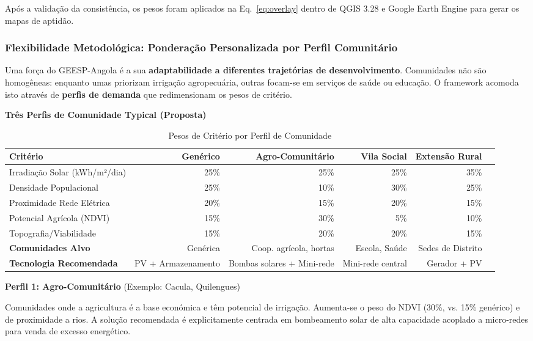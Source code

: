 \documentclass[12pt, a4paper]{article}
\begin{document}
Após a validação da consistência, os pesos foram aplicados na Eq.~\ref{eq:overlay} dentro de QGIS 3.28 e Google Earth Engine para gerar os mapas de aptidão.

\subsubsection{Flexibilidade Metodológica: Ponderação Personalizada por Perfil Comunitário}

Uma força do GEESP-Angola é a sua \textbf{adaptabilidade a diferentes trajetórias de 
desenvolvimento}. Comunidades não são homogêneas: enquanto umas priorizam irrigação 
agropecuária, outras focam-se em serviços de saúde ou educação. O framework acomoda 
isto através de \textbf{perfis de demanda} que redimensionam os pesos de critério.

\textbf{Três Perfis de Comunidade Typical (Proposta)}

\begin{table}[H]
\centering
\caption{Pesos de Critério por Perfil de Comunidade}
\label{tab:profiles_weights}
\footnotesize
\begin{tabular}{|l|r|r|r|r|r|}
\hline
\textbf{Critério} & \textbf{Genérico} & \textbf{Agro-Comunitário} & \textbf{Vila Social} & \textbf{Extensão Rural} \\
\hline
Irradiação Solar (kWh/m²/dia) & 25\% & 25\% & 25\% & 35\% \\
Densidade Populacional & 25\% & 10\% & 30\% & 25\% \\
Proximidade Rede Elétrica & 20\% & 15\% & 20\% & 15\% \\
Potencial Agrícola (NDVI) & 15\% & 30\% & 5\% & 10\% \\
Topografia/Viabilidade & 15\% & 20\% & 20\% & 15\% \\
\hline
\textbf{Comunidades Alvo} & Genérica & Coop. agrícola, hortas & Escola, Saúde & Sedes de Distrito \\
\hline
\textbf{Tecnologia Recomendada} & PV + Armazenamento & Bombas solares + Mini-rede & Mini-rede central & Gerador + PV \\
\hline
\end{tabular}
\end{table}

\textbf{Perfil 1: Agro-Comunitário} (Exemplo: Cacula, Quilengues)

Comunidades onde a agricultura é a base económica e têm potencial de irrigação. 
Aumenta-se o peso do NDVI (30\%, vs. 15\% genérico) e de proximidade a rios. 
A solução recomendada é explicitamente centrada em bombeamento solar de alta capacidade 
acoplado a micro-redes para venda de excesso energético.
\end{document}
